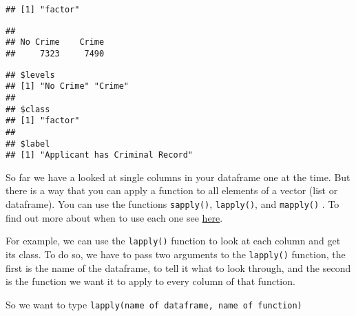 \documentclass[
]{book}
\newenvironment{Shaded}{\begin{snugshade}}{\end{snugshade}}
\newcommand{\FunctionTok}[1]{\textcolor[rgb]{0.13,0.29,0.53}{\textbf{#1}}}
\newcommand{\NormalTok}[1]{#1}
\newcommand{\SpecialCharTok}[1]{\textcolor[rgb]{0.81,0.36,0.00}{\textbf{#1}}}
\begin{document}
\begin{Shaded}
\end{Shaded}

\begin{verbatim}
## [1] "factor"
\end{verbatim}

\begin{Shaded}
\end{Shaded}

\begin{verbatim}
## 
## No Crime    Crime 
##     7323     7490
\end{verbatim}

\begin{Shaded}
\end{Shaded}

\begin{verbatim}
## $levels
## [1] "No Crime" "Crime"   
## 
## $class
## [1] "factor"
## 
## $label
## [1] "Applicant has Criminal Record"
\end{verbatim}

So far we have a looked at single columns in your dataframe one at the time. But there is a way that you can apply a function to all elements of a vector (list or dataframe). You can use the functions \texttt{sapply()}, \texttt{lapply()}, and \texttt{mapply()} . To find out more about when to use each one see \href{https://www.r-bloggers.com/using-apply-sapply-lapply-in-r/}{here}.

For example, we can use the \texttt{lapply()} function to look at each column and get its class. To do so, we have to pass two arguments to the \texttt{lapply()} function, the first is the name of the dataframe, to tell it what to look through, and the second is the function we want it to apply to every column of that function.

So we want to type \texttt{lapply(\textquotesingle{}name\ of\ dataframe\textquotesingle{},\ \textquotesingle{}name\ of\ function\textquotesingle{})}
\end{document}

